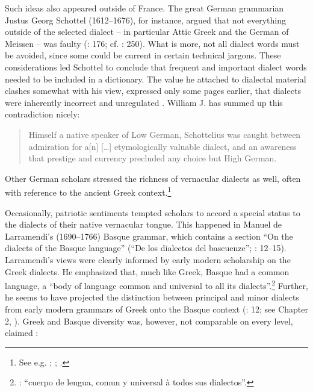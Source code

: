 Such ideas also appeared outside of France. The great German grammarian Justus Georg Schottel (1612–1676), for instance, argued that not everything outside of the selected dialect – in particular Attic Greek and the German of Meissen – was faulty (\citealt{Schottel1663}: 176; cf. \citealt{Roelcke2014}: 250). What is more, not all dialect words must be avoided, since some could be current in certain technical jargons. These considerations led Schottel to conclude that frequent and important dialect words needed to be included in a dictionary. The value he attached to dialectal material clashes somewhat with his view, expressed only some pages earlier, that dialects were inherently incorrect and unregulated \citep[174]{Schottel1663}. William J. \citet[1110]{Jones2001} has summed up this contradiction nicely:

\begin{quote}
Himself a native speaker of Low German, Schottelius was caught between admiration for a[n] […] etymologically valuable dialect, and an awareness that prestige and currency precluded any choice but High German.
\end{quote}

Other German scholars stressed the richness of vernacular dialects as well, often with reference to the ancient Greek context.\footnote{See e.g. \citet[\textsc{a.3}\textsc{\textsuperscript{r}}\textsc{–a.3}\textsc{\textsuperscript{v}}]{Chytraeus1582}; \citet[\textsc{c.1}\textsc{\textsuperscript{r}}]{Meisner1705}; \citet[73]{Hertling1708}.}

Occasionally, patriotic sentiments tempted scholars to accord a special status to the dialects of their native vernacular tongue. This happened in Manuel de Larramendi’s (1690–1766) Basque grammar, which contains a section “On the dialects of the Basque language” (“De los dialectos del bascuenze”; \citealt{Larramendi1729}: 12–15). Larramendi’s views were clearly informed by early modern scholarship on the Greek dialects. He emphasized that, much like Greek, Basque had a common language, a “body of language common and universal to all its dialects”.\footnote{\citet[12--13]{Larramendi1729}: “cuerpo de lengua, comun y universal à todos sus dialectos”.} Further, he seems to have projected the distinction between principal and minor dialects from early modern grammars of Greek onto the Basque context (\citealt{Larramendi1729}: 12; see Chapter 2, ). Greek and Basque diversity was, however, not comparable on every level, claimed \citet[12]{Larramendi1729}:

